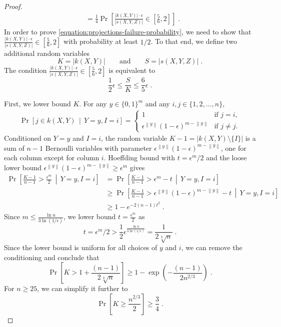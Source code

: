 \documentclass[11pt]{article}
\newcommand{\norm}[1]{\left\| #1 \right\|}
\begin{document}
\begin{proof}
\begin{align*}
& =
\frac{1}{4} \Pr \left[ \frac{|k(X,Y)| \cdot \epsilon}{|s(X,Y,Z)|} \in \left[\frac{5}{6}, 2 \right]  \right] \; .
\end{align*}
In order to prove \eqref{equation:projections-failure-probability}, we need to show that
$\frac{|k(X,Y)| \cdot \epsilon}{|s(X,Y,Z)|} \in \left[\frac{5}{6}, 2 \right]$ with
probability at least $1/2$. To that end, we define two additional random
variables
$$
K = |k(X,Y)| \qquad \text{and} \qquad S = |s(X,Y,Z)| \; .
$$
The condition $\frac{|k(X,Y)| \cdot \epsilon}{|s(X,Y,Z)|} \in \left[\frac{5}{6}, 2 \right]$ is equivalent to
\begin{equation}
\label{equation:ratio-condition}
\frac{1}{2} \epsilon \le \frac{S}{K} \le \frac{6}{5} \epsilon \; .
\end{equation}

First, we lower bound $K$. For any $y \in \{0,1\}^m$ and any $i,j \in \{1,2,\dots,n\}$,
\begin{align*}
\Pr \left[ j \in k(X,Y)  \, \middle| \, Y = y, I = i \right]  =
\begin{cases}
1 & \text{if $j = i$,} \\
\epsilon^{\norm{y}} (1 - \epsilon)^{m - \norm{y}} & \text{if $j \neq j$.}
\end{cases}
\end{align*}
Conditioned on $Y = y$ and $I=i$, the random variable $K - 1 = |k(X,Y) \setminus \{I\}|$ is
a sum of $n-1$ Bernoulli variables with parameter $\epsilon^{\norm{y}} (1 - \epsilon)^{m - \norm{y}}$, one for each column except for column $i$.
Hoeffding bound with $t = \epsilon^m/2$ and the loose lower bound $\epsilon^{\norm{y}} (1 - \epsilon)^{m - \norm{y}} \ge \epsilon^m$ gives
\begin{align*}
\Pr \left[ \frac{K - 1}{n - 1} > \frac{\epsilon^m}{2}  \, \middle| \,  Y = y, I = i  \right] 
& = \Pr \left[ \frac{K - 1}{n - 1} > \epsilon^m - t  \, \middle| \,  Y = y, I = i  \right] \\
& \ge \Pr \left[ \frac{K - 1}{n - 1} > \epsilon^{\norm{y}} (1 - \epsilon)^{m - \norm{y}} - t  \, \middle| \,  Y = y, I = i  \right] \\
& \ge 1 - e^{-2(n-1) t^2} \; .
\end{align*}
Since $m \le \frac{\ln n}{3 \ln (1/\epsilon)}$, we lower bound $t = \frac{\epsilon^m}{2}$ as
$$
t = \epsilon^m/2 > \frac{1}{2} \epsilon^\frac{\ln n}{3 \ln(1/\epsilon)} = \frac{1}{2\sqrt[3]{n}} \; .
$$
Since the lower bound is uniform for all choices of $y$ and $i$, we can remove
the conditioning and conclude that
$$
\Pr \left[ K > 1 + \frac{(n-1)}{2\sqrt[3]{n}} \right] \ge 1 - \exp \left(- \frac{(n-1)}{2 n^{2/3}} \right) \; .
$$
For $n \ge 25$, we can simplify it further to
$$
\Pr \left[ K \ge \frac{n^{2/3}}{2} \right] \ge \frac{3}{4} \; .
$$


\end{proof}
\end{document}
